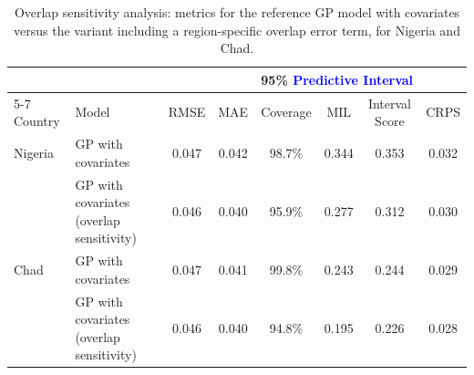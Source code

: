 \begin{table}[t!]
    \centering
    \caption{Overlap sensitivity analysis: metrics for the reference GP model with covariates versus the variant including a region-specific overlap error term, for Nigeria and Chad.}
    \label{tab:prediction_metrics_sens}
    \begin{tabular}{llcccccc}
    \toprule
    & & & & \multicolumn{3}{c}{95\% \textcolor{blue}{Predictive Interval}} & \\
    \cmidrule(lr){5-7}
    Country & Model & RMSE & MAE & Coverage & MIL & Interval Score & CRPS \\
    \midrule
    Nigeria & GP with covariates & 0.047 & 0.042 & 98.7\% & 0.344 & 0.353 & 0.032 \\
     & GP with covariates (overlap sensitivity) & 0.046 & 0.040 & 95.9\% & 0.277 & 0.312 & 0.030 \\
    \midrule
    Chad & GP with covariates & 0.047 & 0.041 & 99.8\% & 0.243 & 0.244 & 0.029 \\
     & GP with covariates (overlap sensitivity) & 0.046 & 0.040 & 94.8\% & 0.195 & 0.226 & 0.028 \\
    \bottomrule
    \end{tabular}
\end{table}

